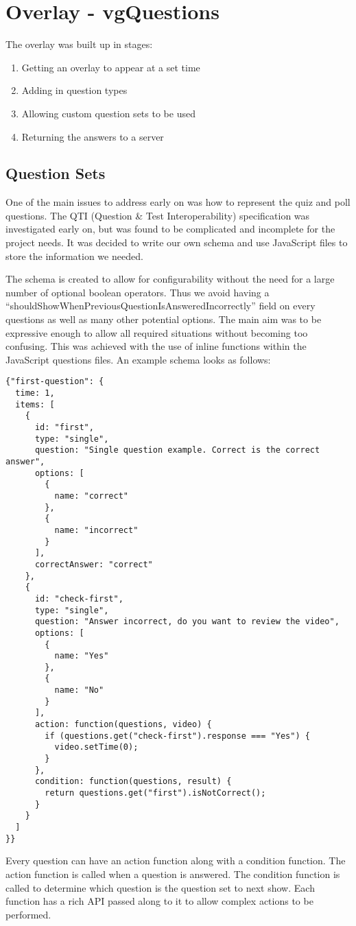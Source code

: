 \chapter{Overlay - vgQuestions} \label{Chapter:Overlay}
The overlay was built up in stages:
\begin{enumerate}
\item Getting an overlay to appear at a set time
\item Adding in question types
\item Allowing custom question sets to be used
\item Returning the answers to a server
\end{enumerate}
\section{Question Sets} 
\label{Section:Question sets}
One of the main issues to address early on was how to represent the quiz and poll questions. The QTI (Question \& Test Interoperability) specification was investigated early on, but was found to be complicated and incomplete for the project needs. It was decided to write our own schema and use JavaScript files to store the information we needed. 

The schema is created to allow for configurability without the need for a large number of optional boolean operators. Thus we avoid having a ``shouldShowWhenPreviousQuestionIsAnsweredIncorrectly'' field on every questions as well as many other potential options. The main aim was to be expressive enough to allow all required situations without becoming too confusing. This was achieved with the use of inline functions within the JavaScript questions files. An example schema looks as follows:
\begin{lstlisting}
{"first-question": {
  time: 1,
  items: [
    {
      id: "first",
      type: "single",
      question: "Single question example. Correct is the correct answer",
      options: [
        {
          name: "correct"
        },
        {
          name: "incorrect"
        }
      ],
      correctAnswer: "correct"
    },
    {
      id: "check-first",
      type: "single",
      question: "Answer incorrect, do you want to review the video",
      options: [
        {
          name: "Yes"
        },
        {
          name: "No"
        }
      ],
      action: function(questions, video) {
        if (questions.get("check-first").response === "Yes") {
          video.setTime(0);
        }
      },
      condition: function(questions, result) {
        return questions.get("first").isNotCorrect();
      }
    }
  ]
}}
\end{lstlisting}
Every question can have an action function along with a condition function. The action function is called when a question is answered. The condition function is called to determine which question is the question set to next show. Each function has a rich API passed along to it to allow complex actions to be performed.

